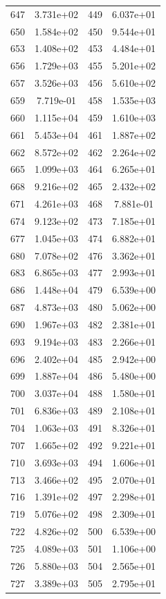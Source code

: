 \documentclass[12pt]{article}
\begin{document}
\begin{longtable}{@{}cccc@{}}
647 & 3.731e+02 & 449 & 6.037e+01 \\
650 & 1.584e+02 & 450 & 9.544e+01 \\
653 & 1.408e+02 & 453 & 4.484e+01 \\
656 & 1.729e+03 & 455 & 5.201e+02 \\
657 & 3.526e+03 & 456 & 5.610e+02 \\
659 & 7.719e-01 & 458 & 1.535e+03 \\
660 & 1.115e+04 & 459 & 1.610e+03 \\
661 & 5.453e+04 & 461 & 1.887e+02 \\
662 & 8.572e+02 & 462 & 2.264e+02 \\
665 & 1.099e+03 & 464 & 6.265e+01 \\
668 & 9.216e+02 & 465 & 2.432e+02 \\
671 & 4.261e+03 & 468 & 7.881e-01 \\
674 & 9.123e+02 & 473 & 7.185e+01 \\
677 & 1.045e+03 & 474 & 6.882e+01 \\
680 & 7.078e+02 & 476 & 3.362e+01 \\
683 & 6.865e+03 & 477 & 2.993e+01 \\
686 & 1.448e+04 & 479 & 6.539e+00 \\
687 & 4.873e+03 & 480 & 5.062e+00 \\
690 & 1.967e+03 & 482 & 2.381e+01 \\
693 & 9.194e+03 & 483 & 2.266e+01 \\
696 & 2.402e+04 & 485 & 2.942e+00 \\
699 & 1.887e+04 & 486 & 5.480e+00 \\
700 & 3.037e+04 & 488 & 1.580e+01 \\
701 & 6.836e+03 & 489 & 2.108e+01 \\
704 & 1.063e+03 & 491 & 8.326e+01 \\
707 & 1.665e+02 & 492 & 9.221e+01 \\
710 & 3.693e+03 & 494 & 1.606e+01 \\
713 & 3.466e+02 & 495 & 2.070e+01 \\
716 & 1.391e+02 & 497 & 2.298e+01 \\
719 & 5.076e+02 & 498 & 2.309e+01 \\
722 & 4.826e+02 & 500 & 6.539e+00 \\
725 & 4.089e+03 & 501 & 1.106e+00 \\
726 & 5.880e+03 & 504 & 2.565e+01 \\
727 & 3.389e+03 & 505 & 2.795e+01 \\

\end{longtable}
\end{document}
